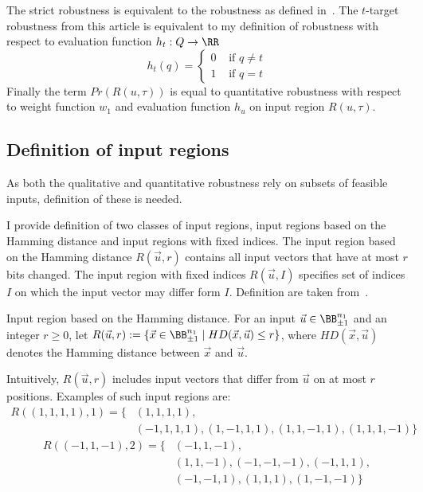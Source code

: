 \label{sec:t-target_robustness}%
The strict robustness is equivalent to the robustness as defined in~\cite{10.1145/3563212}.
The $t$-target robustness from this article is equivalent to my definition
of robustness with respect to evaluation function $h_t: Q\to \RR$
\begin{equation*}
    h_t(q) = \left\{\begin{matrix}
        0 & \text{ if } q \neq t\\
        1 & \text{ if } q = t
    \end{matrix}\right.
\end{equation*}
Finally the term $Pr(R(u, \tau))$ is equal to quantitative robustness  %
with respect to weight function $w_1$ and evaluation function $h_u$
on input region $R(u, \tau)$.


\subsection{Definition of input regions}

As both the qualitative and quantitative robustness rely on subsets
of feasible inputs, definition of these is needed.

I provide definition of two classes of input regions, input regions based
on the Hamming distance and input regions with fixed indices.
The input region based on the Hamming distance $R(\vec u, r)$ contains
all input vectors that have at most $r$ bits changed.
The input region with fixed indices $R(\vec u, I)$ specifies set of indices $I$
on which the input vector may differ form $I$.
Definition are taken from~\cite{zhang2021bdd4bnn}.

\begin{definition}{Input region based on the Hamming distance.}
    For an input $\vec u\in \BB^{n_1}_{\pm 1}$ and an integer $r \geq 0$, let
    $R(\vec u, r) := \{\vec x\in \BB^{n_1}_{\pm 1} \mid HD(\vec x, \vec u) \leq r \}$,
    where $HD(\vec x, \vec u)$ denotes the Hamming distance
    between $\vec x$ and $\vec u$.
\end{definition}

Intuitively, $R(\vec u, r)$ includes input vectors that differ from $\vec u$ on at most
$r$ positions. Examples of such input regions are:
\begin{align*}
    R((1, 1, 1, 1), 1) = \{&(1, 1, 1, 1),\\
    &(-1, 1, 1, 1), (1, -1, 1, 1), (1, 1, -1, 1), (1, 1, 1, -1)\}
\end{align*}
\begin{align*}
    R((-1, 1, -1), 2) = \{&(-1, 1, -1),\\
    &(1, 1, -1), (-1, -1, -1), (-1, 1, 1),\\
    &(-1, -1, 1), (1, 1, 1), (1, -1, -1)\}
\end{align*}

